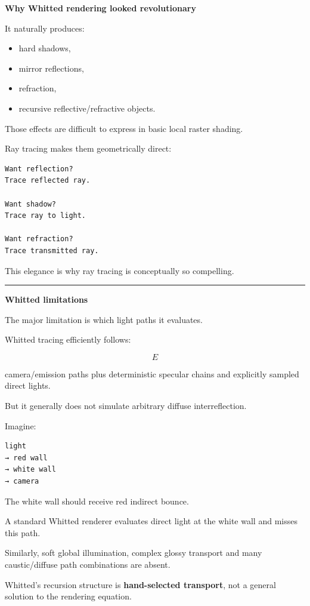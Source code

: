 \textbf{Why Whitted rendering looked revolutionary}

It naturally produces:

\begin{itemize}
\tightlist
\item
  hard shadows,
\item
  mirror reflections,
\item
  refraction,
\item
  recursive reflective/refractive objects.
\end{itemize}

Those effects are difficult to express in basic local raster shading.

Ray tracing makes them geometrically direct:

\begin{verbatim}
Want reflection?
Trace reflected ray.

Want shadow?
Trace ray to light.

Want refraction?
Trace transmitted ray.
\end{verbatim}

This elegance is why ray tracing is conceptually so compelling.

\begin{center}\rule{0.5\linewidth}{0.5pt}\end{center}

\textbf{Whitted limitations}

The major limitation is which light paths it evaluates.

Whitted tracing efficiently follows:

\[
E
\]

camera/emission paths plus deterministic specular chains and explicitly sampled direct lights.

But it generally does not simulate arbitrary diffuse interreflection.

Imagine:

\begin{verbatim}
light
→ red wall
→ white wall
→ camera
\end{verbatim}

The white wall should receive red indirect bounce.

A standard Whitted renderer evaluates direct light at the white wall and misses this path.

Similarly, soft global illumination, complex glossy transport and many caustic/diffuse path combinations are absent.

Whitted's recursion structure is \textbf{hand-selected transport}, not a general solution to the rendering equation.

